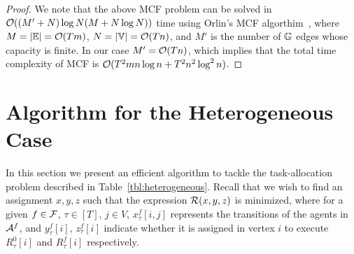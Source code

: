 \documentclass[conference]{IEEEtran}
\begin{document}
\begin{proof}
We note that the above MCF problem can be solved in $\mathcal{O}((M'+N)\log N(M+N\log N))$ time using Orlin's MCF algorthim~\cite{Orlin93,Williamson2019}, where $M=|\mathbb{E}|=\mathcal{O}(Tm)$, $N=|\mathbb{V}|=\mathcal{O}(Tn)$, and $M'$ is the number of $\mathbb{G}$ edges whose capacity is finite. In our case $M'=\mathcal{O}(Tn)$, which implies that the total time complexity of MCF is $\mathcal{O}(T^2mn\log n+T^2n^2\log^2n)$. 


%
\end{proof}

\section{Algorithm for the Heterogeneous Case}\label{sec:centralized}
In this section we present an efficient algorithm to tackle the task-allocation problem described in Table~\ref{tbl:heterogeneous}. %
Recall that we wish to find an assignment $x,y,z$ such that the expression $\mathcal{R}(x,y,z)$ is minimized, where for a given $f\in \mathcal{F}$, $\tau \in [T]$, $j\in V$, $x_{\tau}^f[i,j]$ represents the transitions of the agents in $\mathcal{A}^f$, and $y_{\tau}^f[i]$, $z_{\tau}^f[i]$ indicate whether it is assigned in vertex $i$ to execute $R_{\tau}^0[i]$ and $R_{\tau}^f[i]$ respectively. 
\end{document}
